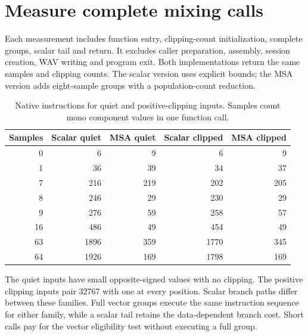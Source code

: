 \section{Measure complete mixing calls}\label{pcm-measurement}
Each measurement includes function entry, clipping-count initialization, complete
groups, scalar tail and return. It excludes caller preparation, assembly, session
creation, WAV writing and program exit. Both implementations return the same samples
and clipping counts. The scalar version uses explicit bounds; the MSA version adds
eight-sample groups with a population-count reduction.

\begin{table}[htbp]
  \centering
  \caption{Native instructions for quiet and positive-clipping inputs. Samples count mono component values in one function call.}
  \begin{tabular}{rrrrr}
    \toprule
    Samples & Scalar quiet & MSA quiet & Scalar clipped & MSA clipped \\
    \midrule
    0       & 6            & 9         & 6              & 9           \\
    1       & 36           & 39        & 34             & 37          \\
    7       & 216          & 219       & 202            & 205         \\
    8       & 246          & 29        & 230            & 29          \\
    9       & 276          & 59        & 258            & 57          \\
    16      & 486          & 49        & 454            & 49          \\
    63      & 1896         & 359       & 1770           & 345         \\
    64      & 1926         & 169       & 1798           & 169         \\
    \bottomrule
  \end{tabular}
\end{table}

The quiet inputs have small opposite-signed values with no clipping. The positive
clipping inputs pair 32767 with one at every position. Scalar branch paths differ
between these families. Full vector groups execute the same instruction sequence
for either family, while a scalar tail retains the data-dependent branch cost.
Short calls pay for the vector eligibility test without executing a full group.

